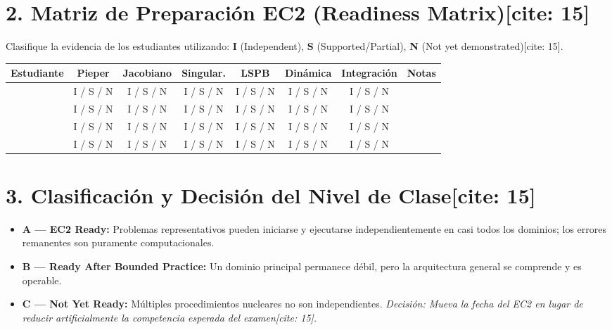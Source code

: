 \documentclass[11pt, a4paper]{article}
\begin{document}
\section*{2. Matriz de Preparación EC2 (Readiness Matrix)[cite: 15]}
Clasifique la evidencia de los estudiantes utilizando: \textbf{I} (Independent), \textbf{S} (Supported/Partial), \textbf{N} (Not yet demonstrated)[cite: 15].

\vspace{0.3cm}
\begin{tabularx}{\textwidth}{|X|c|c|c|c|c|c|c|}
\hline
\rowcolor{ucbblue!10} \textbf{Estudiante} & \textbf{Pieper} & \textbf{Jacobiano} & \textbf{Singular.} & \textbf{LSPB} & \textbf{Dinámica} & \textbf{Integración} & \textbf{Notas} \\ \hline
 & I / S / N & I / S / N & I / S / N & I / S / N & I / S / N & I / S / N & \\ \hline
 & I / S / N & I / S / N & I / S / N & I / S / N & I / S / N & I / S / N & \\ \hline
 & I / S / N & I / S / N & I / S / N & I / S / N & I / S / N & I / S / N & \\ \hline
 & I / S / N & I / S / N & I / S / N & I / S / N & I / S / N & I / S / N & \\ \hline
\end{tabularx}

\section*{3. Clasificación y Decisión del Nivel de Clase[cite: 15]}
\begin{itemize}
    \item \textbf{A — EC2 Ready:} Problemas representativos pueden iniciarse y ejecutarse independientemente en casi todos los dominios; los errores remanentes son puramente computacionales.
    \item \textbf{B — Ready After Bounded Practice:} Un dominio principal permanece débil, pero la arquitectura general se comprende y es operable.
    \item \textbf{C — Not Yet Ready:} Múltiples procedimientos nucleares no son independientes. \textit{Decisión: Mueva la fecha del EC2 en lugar de reducir artificialmente la competencia esperada del examen[cite: 15].}
\end{itemize}
\end{document}
